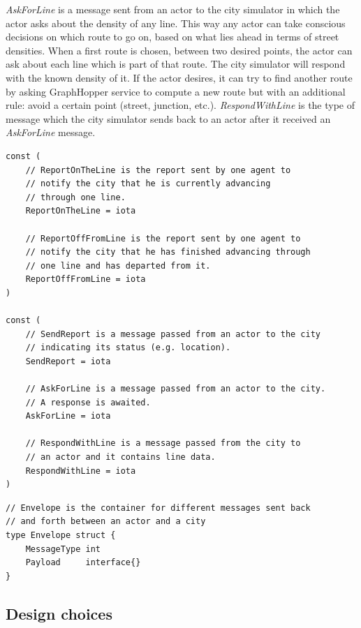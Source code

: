 \documentclass[conference]{IEEEtran}
\begin{document}
\textit{AskForLine} is a message sent from an actor to the city simulator in which the actor asks about the density of any line. This way any actor can take conscious decisions on which route to go on, based on what lies ahead in terms of street densities. When a first route is chosen, between two desired points, the actor can ask about each line which is part of that route. The city simulator will respond with the known density of it. If the actor desires, it can try to find another route by asking GraphHopper service to compute a new route but with an additional rule: avoid a certain point (street, junction, etc.). \textit{RespondWithLine} is the type of message which the city simulator sends back to an actor after it received an \textit{AskForLine} message.

\begin{lstlisting}[caption=Go enumerations for messaging, label=lst:goactorreports]
const (   
    // ReportOnTheLine is the report sent by one agent to
    // notify the city that he is currently advancing
    // through one line.
    ReportOnTheLine = iota
    
    // ReportOffFromLine is the report sent by one agent to
    // notify the city that he has finished advancing through
    // one line and has departed from it.
    ReportOffFromLine = iota
)
    
const (
    // SendReport is a message passed from an actor to the city
    // indicating its status (e.g. location).
    SendReport = iota
    
    // AskForLine is a message passed from an actor to the city.
    // A response is awaited.
    AskForLine = iota
    
    // RespondWithLine is a message passed from the city to
    // an actor and it contains line data.
    RespondWithLine = iota
)
\end{lstlisting}

\begin{lstlisting}[caption=Go top level struct (envelope), label=lst:goenvelope]
// Envelope is the container for different messages sent back
// and forth between an actor and a city
type Envelope struct {
    MessageType int
    Payload     interface{}
}
\end{lstlisting}

\subsection{Design choices}
\label{subsec:designchoices}
\end{document}
